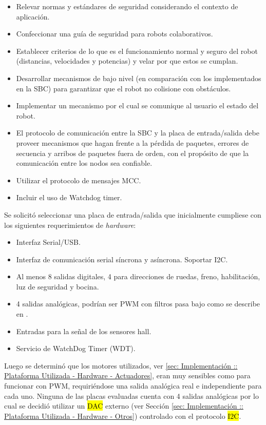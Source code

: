\documentclass[withindex,glossary]{cam-thesis}
\begin{document}
\begin{itemize}
	\item Relevar normas y estándares de seguridad considerando el contexto de aplicación.
	\item Confeccionar una guía de seguridad para robots colaborativos.
	\item Establecer criterios de lo que es el funcionamiento normal y seguro del robot (distancias, velocidades y potencias) y velar por que estos se cumplan.
	\item Desarrollar mecanismos de bajo nivel (en comparación con los implementados en la SBC) para garantizar que el robot no colisione con obstáculos.
	\item Implementar un mecanismo por el cual se comunique al usuario el estado del robot.	
	\item El protocolo de comunicación entre la SBC y la placa de entrada/salida debe proveer mecanismos que hagan frente a la pérdida de paquetes, errores de secuencia y arribos de paquetes fuera de orden, con el propósito de que la comunicación entre los nodos sea confiable.
	\item Utilizar el protocolo de mensajes MCC.
	\item Incluir el uso de Watchdog timer.
\end{itemize}

Se solicitó seleccionar una placa de entrada/salida que inicialmente cumpliese con los siguientes requerimientos de \textit{hardware}:
\begin{itemize}
    \item Interfaz Serial/USB.
    \item Interfaz de comunicación serial síncrona y asíncrona. Soportar I2C.
    \item Al menos 8 salidas digitales, 4 para direcciones de ruedas, freno, habilitación, luz de seguridad y bocina.
    \item 4 salidas analógicas, podrían ser PWM con filtros pasa bajo como se describe en \cite{AN538}.
    \item Entradas para la señal de los sensores hall.
    \item Servicio de WatchDog Timer (WDT).
\end{itemize}
Luego se determinó que los motores utilizados, ver \ref{sec: Implementación :: Plataforma Utilizada - Hardware - Actuadores}, eran muy sensibles como para funcionar con PWM, requiriéndose una salida analógica real e independiente para cada uno. Ninguna de las placas evaluadas cuenta con 4 salidas analógicas por lo cual se decidió utilizar un \hl{DAC} externo (ver Sección \ref{sec: Implementación :: Plataforma Utilizada - Hardware - Otros}) controlado con el protocolo \hl{I2C}.
\end{document}
